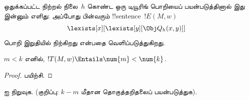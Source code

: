 \documentclass[../../../include/open-logic-section]{subfiles}
\begin{document}
ஒதுக்கப்பட்ட நிற்றல் நிலை~$h$ கொண்ட ஒரு டியூரிங் பொறியைப்
பயன்படுத்தினால் இது இன்னும் எளிது: அப்போது பின்வரும்
!!{sentence}~$!E(M, w)$
\[
\lexists[x][\lexists[y][\Obj Q_h(x, y)]]
\]
பொறி இறுதியில் நிற்கிறது என்பதை வெளிப்படுத்துகிறது.

\begin{prop}
$m < k$ எனில், $!T(M, w) \Entails \num{m} < \num{k}$.
\end{prop}

\begin{proof}
பயிற்சி.
\end{proof}

\begin{prob}
 ஐ நிறுவுக.
(குறிப்பு: $k-m$ மீதான தொகுத்தறிதலைப் பயன்படுத்துக).
\end{prob}
\end{document}
